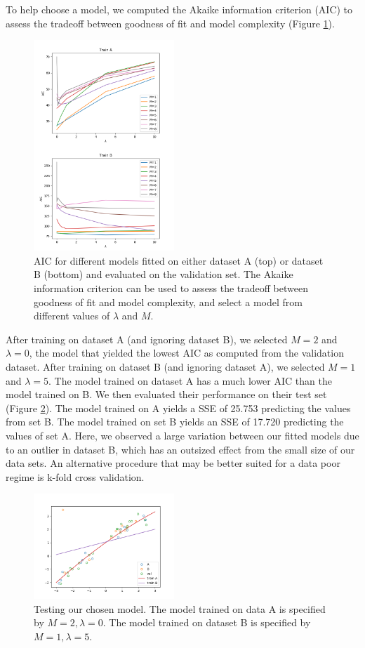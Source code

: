 \documentclass[10pt, twocolumn]{article}
\begin{document}
To help choose a model, we computed the Akaike information criterion (AIC) to assess the tradeoff between goodness of fit and model complexity (Figure \ref{fig:P3_AIC}). 

\begin{figure}
\caption{AIC for different models fitted on either dataset A (top) or dataset B (bottom) and evaluated on the validation set. The Akaike information criterion can be used to assess the tradeoff between goodness of fit and model complexity, and select a model from different values of $\lambda$ and $M$.}
\begin{center}
\includegraphics[width=200px]{P3_AIC}
\end{center}
\label{fig:P3_AIC}
\end{figure}

After training on dataset A (and ignoring dataset B), we selected $M=2$ and $\lambda=0$, the model that yielded the lowest AIC as computed from the validation dataset. After training on dataset B (and ignoring dataset A), we selected $M=1$ and $\lambda=5$. The model trained on dataset A has a much lower AIC than the model trained on B. We then evaluated their performance on their test set (Figure \ref{fig:P3_test}). The model trained on A yields a SSE of 25.753 predicting the values from set B. The model trained on set B yields an SSE of 17.720 predicting the values of set A. Here, we observed a large variation between our fitted models due to an outlier in dataset B, which has an outsized effect from the small size of our data sets. An alternative procedure that may be better suited for a data poor regime is k-fold cross validation.

\begin{figure}
\caption{Testing our chosen model. The model trained on data A is specified by $M=2, \lambda=0$. The model trained on dataset B is specified by $M=1,\lambda=5$.}
\begin{center}
\includegraphics[width=200px]{P3_test}
\end{center}
\label{fig:P3_test}
\end{figure}
\end{document}
